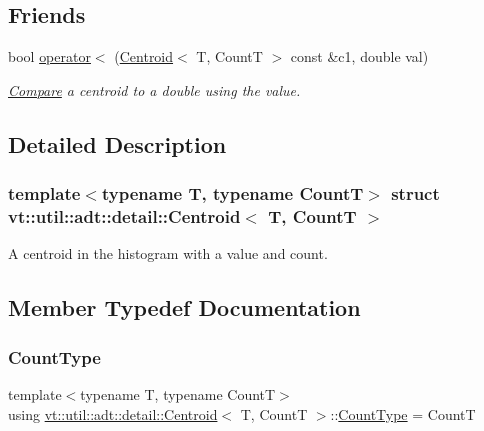\subsection*{Friends}
\begin{DoxyCompactItemize}
\item 
bool \hyperlink{structvt_1_1util_1_1adt_1_1detail_1_1_centroid_a6d689befe39b63c2d22558863e56084f}{operator$<$} (\hyperlink{structvt_1_1util_1_1adt_1_1detail_1_1_centroid}{Centroid}$<$ T, CountT $>$ const \&c1, double val)
\begin{DoxyCompactList}\small\item\em \hyperlink{structvt_1_1util_1_1adt_1_1detail_1_1_compare}{Compare} a centroid to a double using the value. \end{DoxyCompactList}\end{DoxyCompactItemize}


\subsection{Detailed Description}
\subsubsection*{template$<$typename T, typename CountT$>$\newline
struct vt\+::util\+::adt\+::detail\+::\+Centroid$<$ T, Count\+T $>$}

A centroid in the histogram with a value and count. 



\subsection{Member Typedef Documentation}
\mbox{\label{structvt_1_1util_1_1adt_1_1detail_1_1_centroid_ac3815361e4f13eeb8b2863d2eb8db1dd}} 
\subsubsection{\texorpdfstring{Count\+Type}{CountType}}
{\footnotesize\ttfamily template$<$typename T, typename CountT$>$ \\
using \hyperlink{structvt_1_1util_1_1adt_1_1detail_1_1_centroid}{vt\+::util\+::adt\+::detail\+::\+Centroid}$<$ T, CountT $>$\+::\hyperlink{structvt_1_1util_1_1adt_1_1detail_1_1_centroid_ac3815361e4f13eeb8b2863d2eb8db1dd}{Count\+Type} =  CountT}



